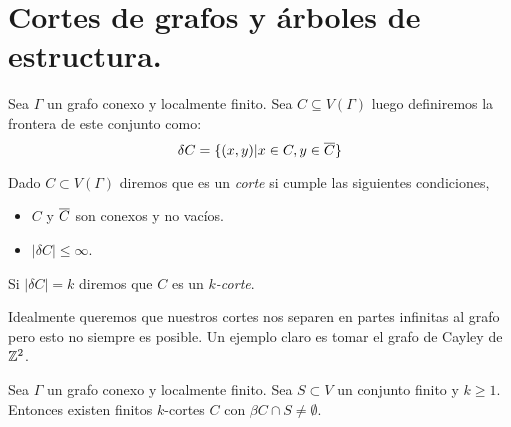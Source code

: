 \documentclass[tesis.tex]{subfiles}
\begin{document}
\section{Cortes de grafos y árboles de estructura.}

\begin{deff}
	Sea $\Gamma$ un grafo conexo y localmente finito. 
	Sea $C \subseteq V(\Gamma)$ luego definiremos la frontera de este conjunto como:	
	\[
	\delta C = \{  (x,y) | x \in C, y \in \overline C    \}
	\]
\end{deff}


\begin{deff}
	Dado $C \subset V(\Gamma)$ diremos que es un \emph{corte} si cumple las siguientes condiciones,
	\begin{itemize}
		\item $C$ y $\overline C$ son conexos y no vacíos.
		\item $|\delta C| \le \infty$.
	\end{itemize}
	Si $|\delta C| = k$ diremos que $C$ es un \emph{$k$-corte}.
\end{deff}	

Idealmente queremos que nuestros cortes nos separen en partes infinitas al grafo pero esto no siempre es posible.
Un ejemplo claro es tomar el grafo de Cayley de $\mathbb{Z}^2$.
	
\begin{lema}\label{lema_finitos_kcortes}
	Sea $\Gamma$ un grafo conexo y localmente finito.
	Sea $S \subset V$ un conjunto finito y $k\ge 1$.
	Entonces existen finitos $k$-cortes $C$ con $\beta C \cap S \neq \emptyset$.
\end{lema}	
\end{document}
